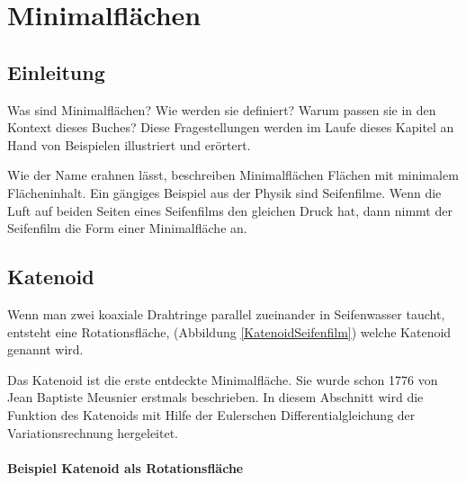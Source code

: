 \chapter{Minimalflächen\label{chapter:minimal}}
\begin{refsection}

\section{Einleitung}
 \label{A_Einleitung}
Was sind Minimalflächen? 
Wie werden sie definiert? 
Warum passen sie in den Kontext dieses Buches?
Diese Fragestellungen werden im Laufe dieses Kapitel an Hand von Beispielen illustriert und erörtert.

Wie der Name erahnen lässt, beschreiben Minimalflächen Flächen mit minimalem Flächeninhalt. 
Ein gängiges Beispiel aus der Physik sind Seifenfilme.
%
Wenn die Luft auf beiden Seiten eines Seifenfilms den gleichen Druck hat, dann nimmt der Seifenfilm die Form einer Minimalfläche an.


\section{Katenoid}
 \label{A_Katenoid}
Wenn man zwei koaxiale Drahtringe parallel zueinander in Seifenwasser taucht, entsteht eine Rotationsfläche, (Abbildung \ref{KatenoidSeifenfilm}) welche Katenoid genannt wird. 
%

Das Katenoid ist die erste entdeckte Minimalfläche.
Sie wurde schon 1776 von Jean Baptiste Meusnier erstmals beschrieben.
%
In diesem Abschnitt wird die Funktion des Katenoids mit Hilfe der Eulerschen Differentialgleichung der Variationsrechnung hergeleitet.
%
%
\subsubsection{Beispiel Katenoid als Rotationsfläche}


\end{refsection}
